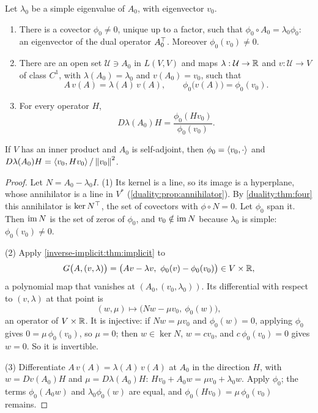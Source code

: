 \begin{notechapter}
\begin{theorem}
\label{inverse-implicit:thm:eigen}
Let $\lambda_0$ be a simple eigenvalue of $A_0$, with eigenvector
$v_0$.
\begin{enumerate}[nosep]
  \item There is a covector $\phi_0\neq0$, unique up to a factor, such
        that $\phi_0\circ A_0 = \lambda_0\phi_0$: an eigenvector of the
        dual operator $A_0^{\top}$. Moreover $\phi_0(v_0)\neq0$.
  \item There are an open set $\mathcal U\ni A_0$ in $L(V, V)$ and
        maps $\lambda:\mathcal U\to\mathbb{R}$ and $v:\mathcal U\to V$ of class
        $C^1$, with $\lambda(A_0) = \lambda_0$ and $v(A_0) = v_0$, such
        that
        \[
          A\,v(A) = \lambda(A)\,v(A) , \qquad
          \phi_0\bigl(v(A)\bigr) = \phi_0(v_0) .
        \]
  \item For every operator $H$,
        \[
          D\lambda(A_0)H = \frac{\phi_0(Hv_0)}{\phi_0(v_0)} .
        \]
\end{enumerate}
If $V$ has an inner product and $A_0$ is self-adjoint, then
$\phi_0 = \left\langle v_0, \cdot \right\rangle$ and
$D\lambda(A_0)H = \left\langle v_0, Hv_0 \right\rangle/\left\|v_0\right\|^2$.
\end{theorem}

\begin{proof}
Let $N = A_0 - \lambda_0I$. (1) Its kernel is a line, so its image is a
hyperplane, whose annihilator is a line in $V^*$
(\cref{duality:prop:annihilator}). By \cref{duality:thm:four} this
annihilator is $\ker N^{\top}$, the set of covectors with
$\phi\circ N = 0$. Let $\phi_0$ span it. Then $\operatorname{im} N$ is the set of
zeros of $\phi_0$, and $v_0\notin\operatorname{im} N$ because $\lambda_0$ is simple:
$\phi_0(v_0)\neq0$.

(2) Apply \cref{inverse-implicit:thm:implicit} to
\[
  G\bigl(A, (v, \lambda)\bigr)
  = \bigl(Av - \lambda v,\ \phi_0(v) - \phi_0(v_0)\bigr)\in V\times\mathbb{R} ,
\]
a polynomial map that vanishes at $(A_0, (v_0, \lambda_0))$. Its
differential with respect to $(v, \lambda)$ at that point is
\[
  (w, \mu)\mapsto\bigl(Nw - \mu v_0,\ \phi_0(w)\bigr) ,
\]
an operator of $V\times\mathbb{R}$. It is injective: if $Nw = \mu v_0$ and
$\phi_0(w) = 0$, applying $\phi_0$ gives $0 = \mu\,\phi_0(v_0)$, so
$\mu = 0$; then $w\in\ker N$, $w = cv_0$, and
$c\,\phi_0(v_0) = 0$ gives $w = 0$. So it is invertible.

(3) Differentiate $A\,v(A) = \lambda(A)\,v(A)$ at $A_0$ in the
direction $H$, with $w = Dv(A_0)H$ and $\mu = D\lambda(A_0)H$:
$Hv_0 + A_0w = \mu v_0 + \lambda_0w$. Apply $\phi_0$; the terms
$\phi_0(A_0w)$ and $\lambda_0\phi_0(w)$ are equal, and
$\phi_0(Hv_0) = \mu\,\phi_0(v_0)$ remains.


\end{proof}
\end{notechapter}
